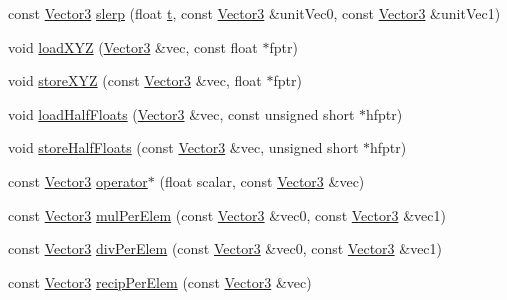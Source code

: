 \begin{DoxyCompactItemize}
\item 
const \hyperlink{classVectormath_1_1Aos_1_1Vector3}{Vector3} \hyperlink{namespaceVectormath_1_1Aos_a9af5675071f612db3ff5a125881b07b8}{slerp} (float \hyperlink{Main_8cpp_a0c8806dd40fb0525e1a3a2a5f78ef88d}{t}, const \hyperlink{classVectormath_1_1Aos_1_1Vector3}{Vector3} \&unit\-Vec0, const \hyperlink{classVectormath_1_1Aos_1_1Vector3}{Vector3} \&unit\-Vec1)
\item 
void \hyperlink{namespaceVectormath_1_1Aos_aa6a407d42aaab50dec93de3c7a51bc9b}{load\-X\-Y\-Z} (\hyperlink{classVectormath_1_1Aos_1_1Vector3}{Vector3} \&vec, const float $\ast$fptr)
\item 
void \hyperlink{namespaceVectormath_1_1Aos_a762b0d6d72de2b728969fb97cfa7a023}{store\-X\-Y\-Z} (const \hyperlink{classVectormath_1_1Aos_1_1Vector3}{Vector3} \&vec, float $\ast$fptr)
\item 
void \hyperlink{namespaceVectormath_1_1Aos_ae632cf46125a93558757edd35f8277c4}{load\-Half\-Floats} (\hyperlink{classVectormath_1_1Aos_1_1Vector3}{Vector3} \&vec, const unsigned short $\ast$hfptr)
\item 
void \hyperlink{namespaceVectormath_1_1Aos_af33e7d56312246dd44d80d60f55c90fd}{store\-Half\-Floats} (const \hyperlink{classVectormath_1_1Aos_1_1Vector3}{Vector3} \&vec, unsigned short $\ast$hfptr)
\item 
const \hyperlink{classVectormath_1_1Aos_1_1Vector3}{Vector3} \hyperlink{namespaceVectormath_1_1Aos_ad609dbb3239661891dfb04bb71cdf35b}{operator$\ast$} (float scalar, const \hyperlink{classVectormath_1_1Aos_1_1Vector3}{Vector3} \&vec)
\item 
const \hyperlink{classVectormath_1_1Aos_1_1Vector3}{Vector3} \hyperlink{namespaceVectormath_1_1Aos_ac9e23759647872dafcb66ea1eb98aadd}{mul\-Per\-Elem} (const \hyperlink{classVectormath_1_1Aos_1_1Vector3}{Vector3} \&vec0, const \hyperlink{classVectormath_1_1Aos_1_1Vector3}{Vector3} \&vec1)
\item 
const \hyperlink{classVectormath_1_1Aos_1_1Vector3}{Vector3} \hyperlink{namespaceVectormath_1_1Aos_ac25b69889cff46aacbe57859ae07941f}{div\-Per\-Elem} (const \hyperlink{classVectormath_1_1Aos_1_1Vector3}{Vector3} \&vec0, const \hyperlink{classVectormath_1_1Aos_1_1Vector3}{Vector3} \&vec1)
\item 
const \hyperlink{classVectormath_1_1Aos_1_1Vector3}{Vector3} \hyperlink{namespaceVectormath_1_1Aos_a4af9e8862ec8b7c3e630dd1b47dac7de}{recip\-Per\-Elem} (const \hyperlink{classVectormath_1_1Aos_1_1Vector3}{Vector3} \&vec)
\item 

\end{DoxyCompactItemize}
